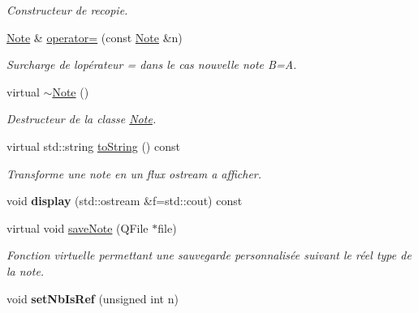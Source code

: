 \begin{DoxyCompactItemize}
\begin{DoxyCompactList}\small\item\em Constructeur de recopie. \end{DoxyCompactList}\item 
\mbox{\label{class_note_ac9b2b6b880bd4c01738ee43bde04b7e5}} 
\hyperlink{class_note}{Note} \& \hyperlink{class_note_ac9b2b6b880bd4c01738ee43bde04b7e5}{operator=} (const \hyperlink{class_note}{Note} \&n)
\begin{DoxyCompactList}\small\item\em Surcharge de l\textquotesingle{}opérateur = dans le cas nouvelle note B=A. \end{DoxyCompactList}\item 
\mbox{\label{class_note_ade484273015c82e7fa59a028de0d8818}} 
virtual \hyperlink{class_note_ade484273015c82e7fa59a028de0d8818}{$\sim$\+Note} ()
\begin{DoxyCompactList}\small\item\em Destructeur de la classe \hyperlink{class_note}{Note}. \end{DoxyCompactList}\item 
virtual std\+::string \hyperlink{class_note_a1bd4acfbde0b71d05fd7d4ca889bca2b}{to\+String} () const
\begin{DoxyCompactList}\small\item\em Transforme une note en un flux ostream a afficher. \end{DoxyCompactList}\item 
\mbox{\label{class_note_a00684fea94bcdcf16f9d40a9d7a8dd5b}} 
void {\bfseries display} (std\+::ostream \&f=std\+::cout) const
\item 
virtual void \hyperlink{class_note_a0c2cc72d7f3235c665a30ef915c5c58d}{save\+Note} (Q\+File $\ast$file)
\begin{DoxyCompactList}\small\item\em Fonction virtuelle permettant une sauvegarde personnalisée suivant le réel type de la note. \end{DoxyCompactList}\item 
\mbox{\label{class_note_acf0ffc4f88903851dce3abf75c3d53f2}} 
void {\bfseries set\+Nb\+Is\+Ref} (unsigned int n)
\item 
\mbox{\label{class_note_a1cb41601ca2dc7c020053c4c0b58f12e}} 

\end{DoxyCompactItemize}
